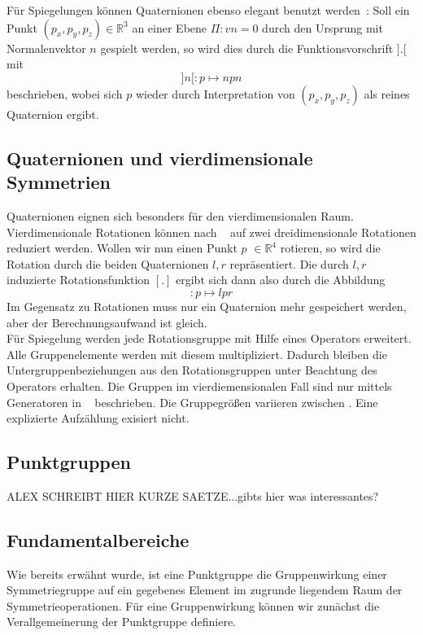 \noindent Für Spiegelungen können Quaternionen ebenso elegant benutzt werden~\cite{1946}: Soll ein Punkt  $(p_x, p_y, p_z) \in \mathbb{R}^3$
an einer Ebene $\Pi: vn = 0$ durch den Ursprung mit Normalenvektor $n$ gespielt werden, so wird dies durch die Funktionsvorschrift $].[$ mit
\begin{equation*}
]n[: p \mapsto n p n
\end{equation*}
beschrieben, wobei sich $p$ wieder durch Interpretation von $(p_x, p_y, p_z)$ als reines Quaternion ergibt.

\subsection{Quaternionen und vierdimensionale Symmetrien}
Quaternionen eignen sich besonders für den vierdimensionalen Raum. Vierdimensionale Rotationen können nach ~\cite{conway2003} auf zwei dreidimensionale Rotationen reduziert werden.
\noindent Wollen wir nun einen Punkt $p$ $\in \mathbb{R}^4$ rotieren, so wird die Rotation durch die beiden Quaternionen $l,r$ repräsentiert.
Die durch $l,r$ induzierte Rotationsfunktion $[.]$ ergibt sich dann also durch die Abbildung
\begin{equation*}
[l,r]: p \mapsto l p r
\end{equation*}
Im Gegensatz zu Rotationen muss nur ein Quaternion mehr gespeichert werden,  aber der Berechnungsaufwand ist gleich.\\
Für Spiegelung werden jede Rotationsgruppe mit Hilfe eines Operators erweitert. Alle Gruppenelemente werden mit diesem multipliziert. Dadurch bleiben die Untergruppenbeziehungen aus den Rotationsgruppen unter Beachtung des Operators erhalten.
Die Gruppen im vierdiemensionalen Fall sind nur mittels Generatoren in ~\cite{conway2003} beschrieben. Die Gruppegrößen variieren zwischen . Eine explizierte Aufzählung exisiert nicht. 

\subsection{Punktgruppen}
ALEX SCHREIBT HIER KURZE SAETZE...gibts hier was interessantes?

\subsection{Fundamentalbereiche}\label{fundamentalbereich}

Wie bereits erwähnt wurde, ist eine Punktgruppe die Gruppenwirkung einer Symmetriegruppe auf ein gegebenes Element im zugrunde liegendem Raum der Symmetrieoperationen.
Für eine Gruppenwirkung können wir zunächst die Verallgemeinerung der Punktgruppe definiere.

